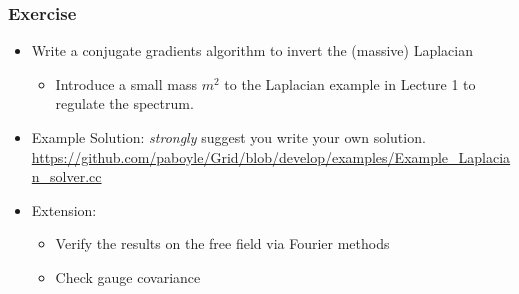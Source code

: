 \documentclass[pdf,ps,8pt]{beamer}
\begin{document}
\begin{frame}[fragile]\small\frametitle{ Exercise}

\begin{itemize}
\item Write a conjugate gradients algorithm to invert the (massive) Laplacian
\begin{itemize}
\item Introduce a small mass $m^2$ to the Laplacian example in Lecture 1 to regulate the spectrum.
\end{itemize}
\item Example Solution: \emph{strongly} suggest you write your own solution.
\href{https://github.com/paboyle/Grid/blob/develop/examples/Example_Laplacian_solver.cc}
     {\color{blue} https://github.com/paboyle/Grid/blob/develop/examples/Example\_Laplacian\_solver.cc}

\item Extension:
\begin{itemize}
\item Verify the results on the free field via Fourier methods
\item Check gauge covariance
\end{itemize}
\end{itemize}

\end{frame}
\end{document}

